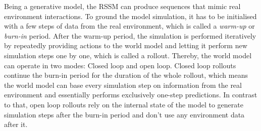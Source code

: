 \documentclass{article}
\begin{document}
Being a generative model, the RSSM can produce sequences that mimic real environment interactions. To ground the model simulation, it has to be initialised with a few steps of data from the real environment, which is called a \textit{warm-up} or \textit{burn-in} period. 
After the warm-up period, the simulation is performed iteratively by repeatedly providing actions to the world model and letting it perform new simulation steps one by one, which is called a rollout. Thereby, the world model can operate in two modes: Closed loop and open loop. Closed loop rollouts continue the burn-in period for the duration of the whole rollout, which means the world model can base every simulation step on information from the real environment and essentially performs exclusively one-step predictions. In contrast to that, open loop rollouts rely on the internal state of the model to generate  simulation steps after the burn-in period and don't use any environment data after it.  
\end{document}
